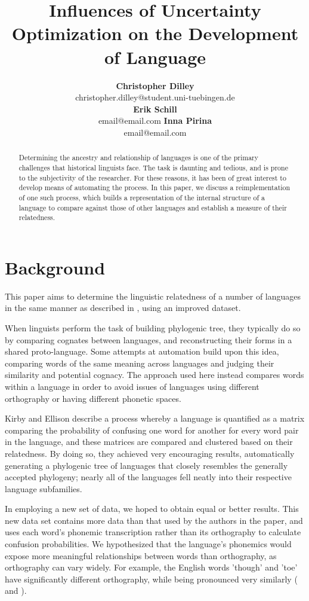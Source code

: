 \documentclass[10pt,a4]{article}
\title{Influences of Uncertainty Optimization on the Development of Language}
\author{{\large \bf Christopher Dilley} \\
	 christopher.dilley@student.uni-tuebingen.de \\\And
	{\large \bf Erik Schill} \\
	email@email.com \And
	{\large \bf Inna Pirina} \\
	email@email.com }
\begin{document}
\maketitle


\begin{abstract}
	
	Determining the ancestry and relationship of languages is one of the primary challenges that historical linguists face.  The task is daunting and tedious, and is prone to the subjectivity of the researcher.  For these reasons, it has been of great interest to develop means of automating the process.  In this paper, we discuss a reimplementation of one such process, which builds a representation of the internal structure of a language to compare against those of other languages and establish a measure of their relatedness.
	
\end{abstract}


\section{Background}

This paper aims to determine the linguistic relatedness of a number of languages in the same manner as described in , using an improved dataset.  

When linguists perform the task of building phylogenic tree, they typically do so by comparing cognates between languages, and reconstructing their forms in a shared proto-language.  Some attempts at automation build upon this idea, comparing words of the same meaning across languages and judging their similarity and potential cognacy.  The approach used here instead compares words within a language in order to avoid issues of languages using different orthography or having different phonetic spaces.

Kirby and Ellison describe a process whereby a language is quantified as a matrix comparing the probability of confusing one word for another for every word pair in the language, and these matrices are compared and clustered based on their relatedness.  By doing so, they achieved very encouraging results, automatically generating a phylogenic tree of languages that closely resembles the generally accepted phylogeny; nearly all of the languages fell neatly into their respective language subfamilies.

In employing a new set of data, we hoped to obtain equal or better results.  This new data set contains more data than that used by the authors in the paper, and uses each word's phonemic transcription rather than its orthography to calculate confusion probabilities.  We hypothesized that the language's phonemics would expose more meaningful relationships between words than orthography, as orthography can vary widely.  For example, the English words 'though' and 'toe' have significantly different orthography, while being pronounced very similarly (\textipa{[Do:]} and \textipa{[to:]}).
\end{document}
